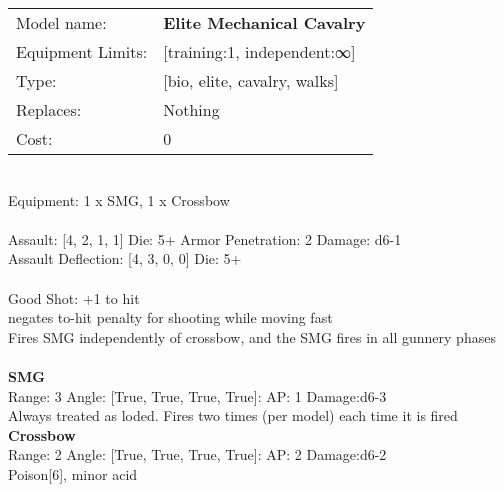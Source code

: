 \noindent 

\noindent
\begin{tabular}{ll}
Model name: &{\bf Elite Mechanical Cavalry } \\
Equipment Limits: &[training:1, independent:∞] \\
Type: &[bio, elite, cavalry, walks] \\
Replaces: &Nothing \\
Cost: & 0\\
\end{tabular}
\ \\
Equipment: 1 x SMG, 1 x Crossbow \\
\ \\
Assault: [4, 2, 1, 1] Die: 5+ Armor Penetration: 2 Damage: d6-1 \\
Assault Deflection: [4, 3, 0, 0] Die: 5+\\
\indent  
\ \\
Good Shot: +1 to hit\\ 
negates to-hit penalty for shooting while moving fast\\ 
Fires SMG independently of crossbow, and the SMG fires in all gunnery phases\\ 

\ \\
{\bf SMG } \\



Range: 3  Angle: [True, True, True, True]: AP: 1 Damage:d6-3 \\
Always treated as loded. Fires two times (per model) each time it is fired\\ 




{\bf Crossbow } \\



Range: 2  Angle: [True, True, True, True]: AP: 2 Damage:d6-2 \\
Poison[6], minor acid\\ 




 
\ \\



